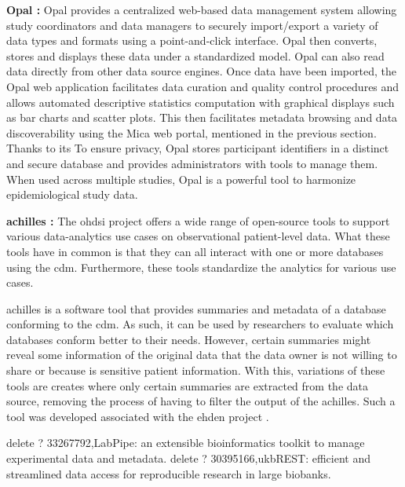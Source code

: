 \textbf{Opal \cite{mica}:}
Opal provides a centralized web-based data management system allowing study
coordinators and data managers to securely import/export a variety of data types and
formats using a point-and-click interface.
Opal then converts, stores and displays these data under a standardized model.
Opal can also read data directly from other data source engines.
Once data have been imported, the Opal web application facilitates data curation and
quality control procedures and allows automated descriptive statistics computation with
graphical displays such as bar charts and scatter plots.
This then facilitates metadata browsing and data discoverability using the Mica web
portal, mentioned in the previous section.
Thanks to its To ensure privacy, Opal stores participant identifiers in a distinct and
secure database and provides administrators with tools to manage them.
When used across multiple studies, Opal is a powerful tool to harmonize epidemiological
study data.

\textbf{\gls{achilles} \cite{achilles-github}:}
The \gls{ohdsi} project offers a wide range of open-source tools\cite{ohdsi-tools} to support various data-analytics use cases on observational patient-level data.
What these tools have in common is that they can all interact with one or more
databases using the \gls{cdm}.
Furthermore, these tools standardize the analytics for various use cases.

\gls{achilles} is a software tool that provides summaries and metadata of a database
conforming to the \gls{cdm}.
As such, it can be used by researchers to evaluate which databases conform better to
their needs.
However, certain summaries might reveal some information of the original data that the
data owner is not willing to share or because is sensitive patient information.
With this, variations of these tools are creates where only certain summaries are
extracted from the data source, removing the process of having to filter the output of
the \gls{achilles}.
Such a tool was developed associated with the \gls{ehden} project \cite{peters-tool}.


%
delete ? 33267792,LabPipe: an extensible bioinformatics toolkit to manage experimental data and metadata.
%
delete ? 30395166,ukbREST: efficient and streamlined data access for reproducible research in large biobanks.
%
%
%
%
%
%
%


